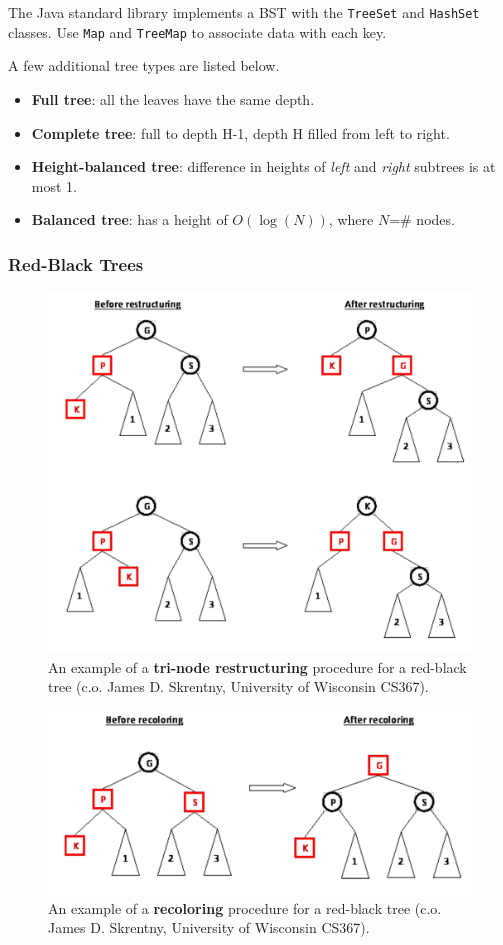 The Java standard library implements a BST with the \texttt{TreeSet} and \texttt{HashSet} classes. Use \texttt{Map} and \texttt{TreeMap} to associate data with each key. 

A few additional tree types are listed below.

\begin{itemize} 
	\item \textbf{Full tree}: all the leaves have the same depth. 
	\item \textbf{Complete tree}: full to depth H-1, depth H filled from left to right. 
	\item \textbf{Height-balanced tree}: difference in heights of \textit{left} and \textit{right} subtrees is at most 1. 
	\item \textbf{Balanced tree}: has a height of $O(\log(N))$, where $N$=\# nodes.
\end{itemize}

\subsubsection{Red-Black Trees}

\begin{figure}[tb]
\centering
\includegraphics[width=0.75\columnwidth]{Figures/restructure.pdf}
\caption{An example of a \textbf{tri-node restructuring} procedure for a red-black tree (c.o. James D. Skrentny, University of Wisconsin CS367).}
\label{fig:trinoderestructuring}
\end{figure}

\begin{figure}[tb]
\centering
\includegraphics[width=0.75\columnwidth]{Figures/recoloring.pdf}
\caption{An example of a \textbf{recoloring} procedure for a red-black tree (c.o. James D. Skrentny, University of Wisconsin CS367).}
\label{fig:recoloring}
\end{figure}

